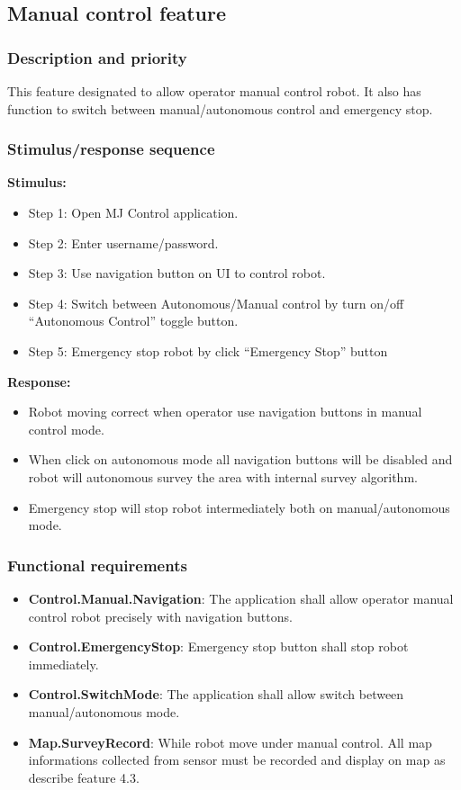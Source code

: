 \documentclass[10pt,a4paper,titlepage]{article}
\begin{document}
	\subsection{Manual control feature }
	\subsubsection{Description and priority}
	\text This feature designated to allow operator manual control robot. It also has function to switch between manual/autonomous control and emergency stop.
	\subsubsection{Stimulus/response sequence}
	\textbf{Stimulus:}
	\begin{itemize}
		\item Step 1: Open MJ Control application.
		\item Step 2: Enter username/password.
		\item Step 3: Use navigation button on UI to control robot.
		\item Step 4: Switch between Autonomous/Manual control by turn on/off “Autonomous Control” toggle button.
		\item Step 5: Emergency stop robot by click “Emergency Stop” button
	\end{itemize}
	\textbf{Response:}
	\begin{itemize}
		\item Robot moving correct when operator use navigation buttons in manual control mode.
		\item When click on autonomous mode all navigation buttons will be disabled and robot will autonomous survey the area with internal survey algorithm.
		\item Emergency stop will stop robot intermediately both on manual/autonomous mode.
	\end{itemize}
	\subsubsection{Functional requirements}
	\begin{itemize}
		\item \textbf{Control.Manual.Navigation}: The application shall allow operator manual control robot precisely with navigation buttons.
		\item \textbf{Control.EmergencyStop}: Emergency stop button shall stop robot immediately.
		\item \textbf{Control.SwitchMode}: The application shall allow switch between manual/autonomous mode.
		\item \textbf{Map.SurveyRecord}: While robot move under manual control. All map informations collected from sensor must be recorded and display on map as describe feature 4.3.
	\end{itemize}
	
\end{document}
